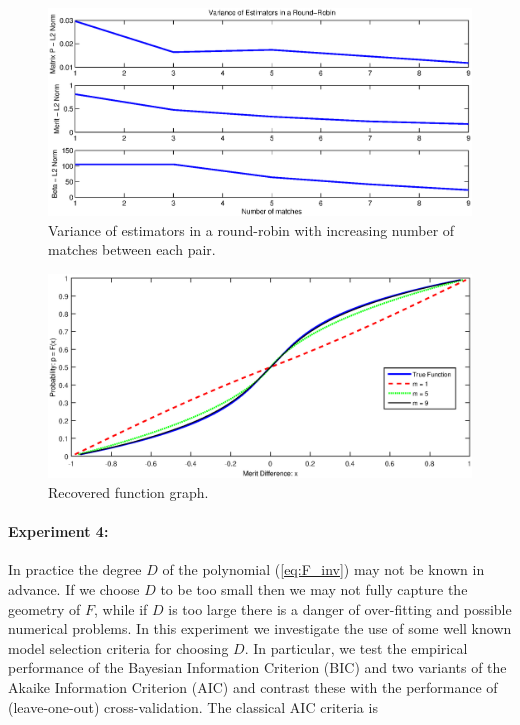\documentclass[twoside,11pt]{article}
\begin{document}
\begin{figure}
  \centering
    \includegraphics[width=1\textwidth]{variance_estimators_round_robin}
    \caption{Variance of estimators in a round-robin with increasing number of matches between each pair. \label{fig:var_round_robin}}
\end{figure}

\begin{figure}
  \centering
    \includegraphics[width=1\textwidth]{round_robin_function_graph}
    \caption{Recovered function graph. \label{fig:round_robin_function}}
\end{figure}

\paragraph{Experiment 4:}

In practice the degree $D$ of the polynomial (\ref{eq:F_inv}) may not be known in advance. If we choose $D$ to be too small then we may not fully capture the geometry of $F$, while if $D$ is too large there is a danger of over-fitting and possible numerical problems. In this  experiment we investigate the use of some well known model selection criteria \citep{claeskens} for choosing $D$. In particular, we test the empirical performance of the Bayesian Information Criterion (BIC) and two variants of the Akaike Information Criterion (AIC)  and contrast these with the performance of (leave-one-out) cross-validation. The classical AIC criteria is 
\end{document}
